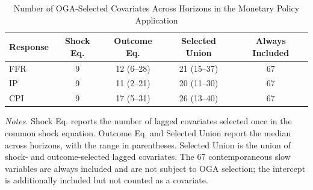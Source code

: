 \begin{table}[htbp]
\centering
\caption{Number of OGA-Selected Covariates Across Horizons in the Monetary Policy Application}
\label{tab:app_empiric_monetary_numselect}
\begin{tabular}{lcccc}
\toprule
Response & Shock Eq. & Outcome Eq. & Selected Union & Always Included \\ 
\midrule
FFR & 9 & 12 (6--28) & 21 (15--37) & 67 \\
IP & 9 & 11 (2--21) & 20 (11--30) & 67 \\
CPI & 9 & 17 (5--31) & 26 (13--40) & 67 \\
\bottomrule
\end{tabular}
\begin{minipage}{0.94\textwidth}
\footnotesize \textit{Notes.} Shock Eq. reports the number of lagged covariates selected once in the common shock equation. Outcome Eq. and Selected Union report the median across horizons, with the range in parentheses. Selected Union is the union of shock- and outcome-selected lagged covariates. The 67 contemporaneous slow variables are always included and are not subject to OGA selection; the intercept is additionally included but not counted as a covariate.
\end{minipage}
\end{table}
